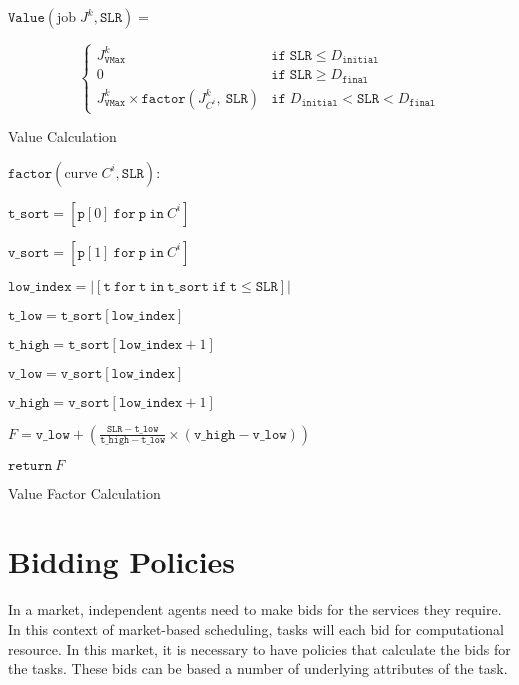 \documentclass[english,british]{IEEEtran}
\begin{document}
\begin{algorithm}
$\mathtt{Value}\left(\textrm{job}\;J^{k},\mathtt{SLR}\right)=$

\[
\begin{cases}
J_{\mathtt{VMax}}^{k} & \mathtt{if\;SLR}\leq D_{\mathtt{initial}}\\
0 & \mathtt{if\;SLR}\geq D_{\mathtt{final}}\\
J_{\mathtt{VMax}}^{k}\times\mathtt{factor}\left(J_{C^{i}}^{k},\:\mathtt{SLR}\right) & \mathtt{if}\;D_{\mathtt{initial}}<\mathtt{SLR}<D_{\mathtt{final}}
\end{cases}
\]


\protect\caption{Value Calculation}


\label{value-algorithm}
\end{algorithm}


\begin{algorithm}
$\mathtt{factor}\left(\textrm{curve}\;C^{i},\mathtt{SLR}\right):$

\quad{}$\mathtt{t\_sort=}\left[\mathtt{p}\left[0\right]\mathtt{\:for\:p\:in\:}C^{i}\right]$

\quad{}$\mathtt{v\_sort=}\left[\mathtt{p}\left[1\right]\mathtt{\:for\:p\:in\:}C^{i}\right]$

\quad{}$\mathtt{low\_index=}\left|\left[\mathtt{t\:for\:t\:in\:t\_sort\:if\:t}\leq\mathtt{SLR}\right]\right|$

\quad{}$\mathtt{t\_low=t\_sort}\left[\mathtt{low\_index}\right]$

\quad{}$\mathtt{t\_high=t\_sort}\left[\mathtt{low\_index}+1\right]$

\quad{}$\mathtt{v\_low=v\_sort}\left[\mathtt{low\_index}\right]$

\quad{}$\mathtt{v\_high=v\_sort}\left[\mathtt{low\_index}+1\right]$

\quad{}$F=\mathtt{v\_low}+\left(\frac{\mathtt{SLR-t\_low}}{\mathtt{t\_high-t\_low}}\times\left(\mathtt{v\_high-v\_low}\right)\right)$

\quad{}$\mathtt{return}\:F$

\protect\caption{Value Factor Calculation\label{value_factor_algorithm}}
\end{algorithm}



\section{Bidding Policies}

In a market, independent agents need to make bids for the services
they require. In this context of market-based scheduling, tasks will
each bid for computational resource. In this market, it is necessary
to have policies that calculate the bids for the tasks. These bids
can be based a number of underlying attributes of the task.
\end{document}
